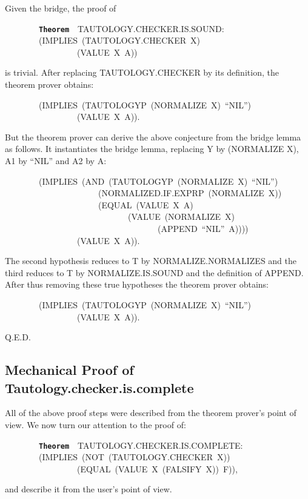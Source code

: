 \documentclass[11pt]{book}
\newenvironment{pubasis}{\begin{flushleft}\ttfamily\small}{\normalsize\rmfamily\end{flushleft}}
\newcommand{\axiomordefinition}[1]{\vspace{6pt}\texttt{\textbf{#1}}}
\newcommand{\pubdefaulttextsize}{\large}
\begin{document}
Given the bridge, the proof of
\begin{pubasis}
~~~~~~~~\axiomordefinition{Theorem}~~TAU\-TOL\-OGY.CHECK\-ER.IS.SOUND:\\
~~~~~~~~(IMPLIES~(TAU\-TOL\-OGY.CHECK\-ER~X)\\
~~~~~~~~~~~~~~~~~(VALUE~X~A))\\
\end{pubasis}
is trivial.  After replacing TAU\-TOL\-OGY.CHECK\-ER by its definition,
the theorem prover obtains:
\begin{pubasis}
~~~~~~~~(IMPLIES~(TAUTOLOGYP~(NORMALIZE~X)~``NIL'')\\
~~~~~~~~~~~~~~~~~(VALUE~X~A)).\\
\end{pubasis}
But the theorem prover can derive the above conjecture
from the bridge lemma as follows.
It instantiates the bridge lemma, replacing Y by (NORMALIZE X),
A1 by ``NIL'' and A2 by A:
\begin{pubasis}
~~~~~~~~(IMPLIES~(AND~(TAUTOLOGYP~(NORMALIZE~X)~``NIL'')\\
~~~~~~~~~~~~~~~~~~~~~~(NOR\-MAL\-IZED.IF.EXPRP~(NOR\-MAL\-IZE~X))\\
~~~~~~~~~~~~~~~~~~~~~~(EQUAL~(VALUE~X~A)\\
~~~~~~~~~~~~~~~~~~~~~~~~~~~~~(VALUE~(NORMALIZE~X)\\
~~~~~~~~~~~~~~~~~~~~~~~~~~~~~~~~~~~~(APPEND~``NIL''~A))))\\
~~~~~~~~~~~~~~~~~(VALUE~X~A)).\\
\end{pubasis}
The second hypothesis reduces to T by NOR\-MAL\-IZE.NOR\-MAL\-IZES and the
third reduces to T by NOR\-MAL\-IZE.IS.SOUND and the definition of APPEND.
After thus removing these true hypotheses the theorem prover obtains:
\begin{pubasis}
~~~~~~~~(IMPLIES~(TAUTOLOGYP~(NORMALIZE~X)~``NIL'')\\
~~~~~~~~~~~~~~~~~(VALUE~X~A)).\\
\end{pubasis}
Q.E.D.
\subsection{Mechanical Proof of Tautology.checker.is.complete}
\pubdefaulttextsize
All of the above proof steps were described from the theorem prover's
point of view.  We now turn our attention to the proof of:
\begin{pubasis}
~~~~~~~~\axiomordefinition{Theorem}~~TAU\-TOL\-OGY.CHECK\-ER.IS.COMPLETE:\\
~~~~~~~~(IMPLIES~(NOT~(TAU\-TOL\-OGY.CHECK\-ER~X))\\
~~~~~~~~~~~~~~~~~(EQUAL~(VALUE~X~(FALSIFY~X))~F)),\\
\end{pubasis}
and describe it from the user's point of view.
\end{document}

